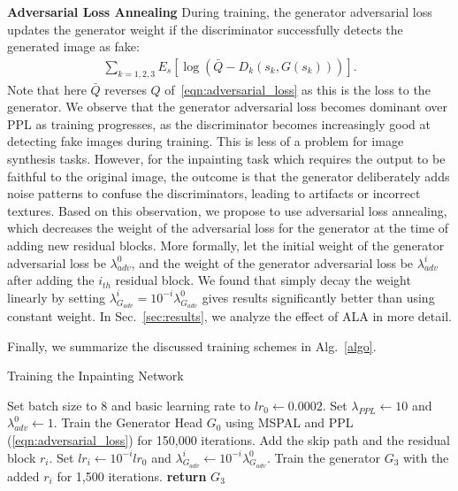 \noindent\textbf{Adversarial Loss Annealing} During training, the generator adversarial loss updates the generator weight if the discriminator successfully detects the generated image as fake:
\begin{eqnarray}
\sum\limits_{k=1,2,3}E_s[\log (\bar{Q}-D_k(s_k,G(s_k)))].
\end{eqnarray}
Note that here $\bar{Q}$ reverses $Q$ of~\ref{eqn:adversarial_loss} as this is the loss to the generator. We observe that the generator adversarial loss becomes dominant over PPL as training progresses, as the discriminator becomes increasingly good at detecting fake images during training. This is less of a problem for image synthesis tasks. However, for the inpainting task which requires the output to be faithful to the original image, the outcome is that the generator deliberately adds noise patterns to confuse the discriminators, leading to artifacts or incorrect textures. Based on this observation, we propose to use adversarial loss annealing, which decreases the weight of the adversarial loss for the generator at the time of adding new residual blocks. More formally, let the initial weight of the generator adversarial loss be $\lambda^0_{adv}$, and the weight of the generator adversarial loss be $\lambda^i_{adv}$ after adding the $i_{th}$ residual block. We found that simply decay the weight linearly by setting $\lambda^i_{G_{adv}}=10^{-i}\lambda^0_{G_{adv}}$ gives results significantly better than using constant weight. In Sec.~\ref{sec:results}, we analyze the effect of ALA in more detail.

Finally, we summarize the discussed training schemes in Alg.~\ref{algo}.
\begin{algorithm}
\caption{Training the Inpainting Network}\label{algo}
\begin{algorithmic}[1]
\State Set batch size to 8 and basic learning rate to $lr_0\gets 0.0002$.
\State Set $\lambda_{PPL}\gets 10$ and $\lambda^0_{{adv}}\gets 1$.
\State Train the Generator Head $G_0$ using MSPAL and PPL (\ref{eqn:adversarial_loss}) for 150,000 iterations.
\State Add the skip path and the residual block $r_i$.
\State Set $lr_i\gets 10^{-i} lr_0$ and $\lambda^i_{G_{adv}}\gets 10^{-i}\lambda^0_{G_{adv}}$.
\State Train the generator $G_3$ with the added $r_i$ for 1,500 iterations.
\EndFor
\State \textbf{return} $G_3$ 
\end{algorithmic}
\end{algorithm}
